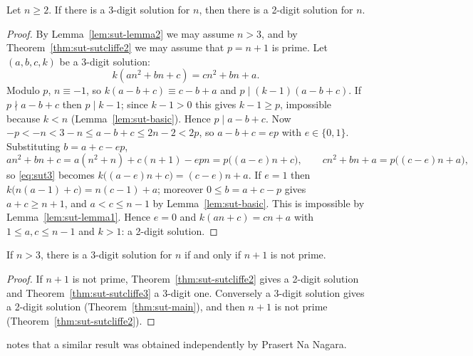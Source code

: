 \begin{theorem}\label{thm:sut-main}
Let $n\ge2$. If there is a 3-digit solution for $n$, then there is a 2-digit solution for $n$.
\end{theorem}
\begin{proof}
By Lemma~\ref{lem:sut-lemma2} we may assume $n>3$, and by Theorem~\ref{thm:sut-sutcliffe2} we may
assume that $p=n+1$ is prime. Let $(a,b,c,k)$ be a 3-digit solution:
\begin{equation}\label{eq:sut3}
k(an^2+bn+c)=cn^2+bn+a .
\end{equation}
Modulo $p$, $n\equiv-1$, so $k(a-b+c)\equiv c-b+a$ and $p\mid(k-1)(a-b+c)$. If $p\nmid a-b+c$ then
$p\mid k-1$; since $k-1>0$ this gives $k-1\ge p$, impossible because $k<n$
(Lemma~\ref{lem:sut-basic}). Hence $p\mid a-b+c$. Now
$-p<-n<3-n\le a-b+c\le 2n-2<2p$, so $a-b+c=ep$ with $e\in\{0,1\}$. Substituting $b=a+c-ep$,
\[
an^2+bn+c=a(n^2+n)+c(n+1)-epn=p\bigl((a-e)n+c\bigr),\qquad cn^2+bn+a=p\bigl((c-e)n+a\bigr),
\]
so \eqref{eq:sut3} becomes $k\bigl((a-e)n+c\bigr)=(c-e)n+a$. If $e=1$ then
$k\bigl(n(a-1)+c\bigr)=n(c-1)+a$; moreover $0\le b=a+c-p$ gives $a+c\ge n+1$, and $a<c\le n-1$ by
Lemma~\ref{lem:sut-basic}. This is impossible by Lemma~\ref{lem:sut-lemma1}. Hence $e=0$ and
$k(an+c)=cn+a$ with $1\le a,c\le n-1$ and $k>1$: a 2-digit solution.
\end{proof}

\begin{corollary}\label{cor:sut-main}
If $n>3$, there is a 3-digit solution for $n$ if and only if $n+1$ is not prime.
\end{corollary}
\begin{proof}
If $n+1$ is not prime, Theorem~\ref{thm:sut-sutcliffe2} gives a 2-digit solution and
Theorem~\ref{thm:sut-sutcliffe3} a 3-digit one. Conversely a 3-digit solution gives a 2-digit solution
(Theorem~\ref{thm:sut-main}), and then $n+1$ is not prime (Theorem~\ref{thm:sut-sutcliffe2}).
\end{proof}

\begin{remark}
\cite{MathMag} notes that a similar result was obtained independently by Prasert Na Nagara.
\end{remark}

